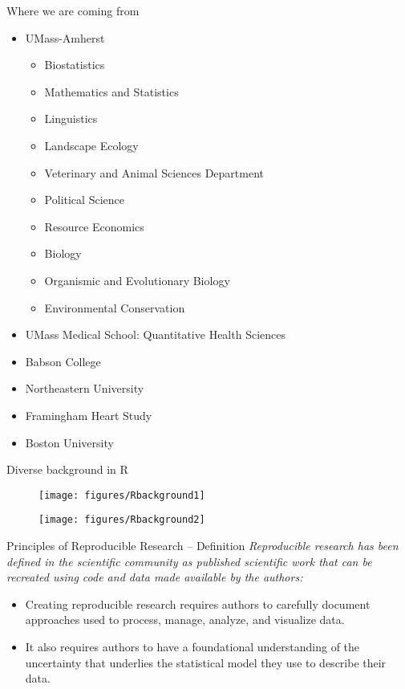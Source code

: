 \documentclass[table]{beamer}\usepackage[]{graphicx}\usepackage[]{color}
\begin{document}
\begin{frame}{Where we are coming from}

\begin{itemize}
        \item UMass-Amherst
                \begin{itemize}
                        \item Biostatistics
                        \item Mathematics and Statistics
                        \item Linguistics
                        \item Landscape Ecology
                        \item Veterinary and Animal Sciences Department
                        \item Political Science
                        \item Resource Economics
                        \item Biology
                        \item Organismic and Evolutionary Biology
                        \item Environmental Conservation
                \end{itemize}                
        \item UMass Medical School: Quantitative Health Sciences
        \item Babson College
        \item Northeastern University
        \item Framingham Heart Study
        \item Boston University
\end{itemize}

\end{frame}


\begin{frame}{Diverse background in R}

\begin{figure}[t]
    \texttt{[image: figures/Rbackground1]}  
\end{figure}
\begin{figure}[t]
    \texttt{[image: figures/Rbackground2]}  
\end{figure}

\end{frame}


\begin{frame}{Principles of Reproducible Research -- Definition}
\emph{Reproducible research has been defined in the scientific community as published scientific work that can be recreated using code and data made available by the authors:} 
\begin{itemize}
\item Creating reproducible research requires authors to carefully document approaches used to process, manage, analyze, and visualize data. 
\item It also requires authors to have a foundational understanding of the uncertainty that underlies the statistical model they use to describe their data. 
\end{itemize}
\end{frame}
\end{document}
